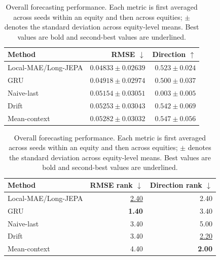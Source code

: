 \begin{table}[t]
\centering
\small
\caption{Overall forecasting performance. Each metric is first averaged across seeds within an equity and then across equities; $\pm$ denotes the standard deviation across equity-level means. Best values are bold and second-best values are underlined.}
\label{tab:main_metrics}
\begin{tabular}{lrr}
\toprule
Method & RMSE $\downarrow$ & Direction $\uparrow$ \\
\midrule
Local-MAE/Long-JEPA & \textbf{$0.04833 \pm 0.02639$} & $0.523 \pm 0.024$ \\
GRU & \underline{$0.04918 \pm 0.02974$} & $0.500 \pm 0.037$ \\
Naive-last & $0.05154 \pm 0.03051$ & $0.003 \pm 0.005$ \\
Drift & $0.05253 \pm 0.03043$ & \underline{$0.542 \pm 0.069$} \\
Mean-context & $0.05282 \pm 0.03032$ & \textbf{$0.547 \pm 0.056$} \\
\bottomrule
\end{tabular}
\par\medskip
\begin{tabular}{lrr}
\toprule
Method & RMSE rank $\downarrow$ & Direction rank $\downarrow$ \\
\midrule
Local-MAE/Long-JEPA & \underline{2.40} & 2.40 \\
GRU & \textbf{1.40} & 3.40 \\
Naive-last & 3.40 & 5.00 \\
Drift & 3.40 & \underline{2.20} \\
Mean-context & 4.40 & \textbf{2.00} \\
\bottomrule
\end{tabular}
\end{table}
